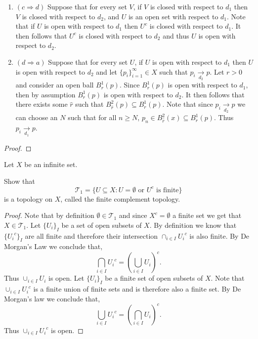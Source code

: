 \documentclass[minion]{homework651}
\newcommand\converges[1]{\mathrel{\mathop{\longrightarrow}\limits_{#1}}}
\begin{document}
\begin{problems}
\begin{enumerate}
    \item $(c \Longrightarrow d)$ Suppose that for every set $V$, if $V$ is closed with respect to $d_1$ then
    $V$ is closed with respect to $d_2$, and $U$ is an open set with respect to $d_1$. Note that if $U$
    is open with respect to $d_1$ then $U^c$ is closed with respect to $d_1$. It then follows that $U^c$ is 
    closed with respect to $d_2$ and thus $U$ is open with respect to $d_2$.  
    

    \item $(d \Longrightarrow a)$ Suppose that for every set $U$, if $U$ is open with respect to $d_1$ then $U$ is open with respect to $d_2$ and let $\{p_i\}_{i=1}^\infty \in X$ such that $p_i\converges{d_2} p$. Let $r>0$ and consider an open ball $B_r^1(p)$. Since $B_r^1(p)$ is open with respect to $d_1$, then by assumption $B_r^1(p)$ is open with respect to $d_2$. It then follows that there exists some $\hat{r}$ such that $B_{\hat{r}}^2(p) \subseteq B_r^1(p)$. Note that since $p_i\converges{d_2} p$ we can choose an $N$ such that for all $n \geq N$, $p_n \in B_{\hat{r}}^2(x) \subseteq B_r^1(p)$. Thus $p_i\converges{d_1} p$.
\end{enumerate}
\begin{proof} 

\end{proof}

\problem Let $X$ be an infinite set. 
\begin{subproblems}
    \item Show that
    \begin{equation*}
        \mathcal{T}_{1} = \{ U \subseteq X: U = \emptyset \text{ or } U^c \text{ is finite}\}
    \end{equation*}
    is a topology on $X$, called the finite complement topology.
    \solution\begin{proof}
        Note that by definition $\emptyset \in \mathcal{T}_{1}$ and since $X^c = \emptyset$ a finite set 
        we get that $X \in \mathcal{T}_{1}$. Let $\{U_i\}_I$ be a set of open subsets of $X$. By definition we know that 
        $\{{U_i}^c\}_I$ are all finite and therefore their intersection $\cap_{i \in I}{U_i}^c$ is also finite.
        By De Morgan's Law we conclude that, 
        \begin{equation*}
            \bigcap_{i \in I}{U_i}^c = \left(\bigcup_{i \in I} U_i\right)^c.
        \end{equation*}
        Thus $\cup_{i \in I} U_i$ is open. Let $\{U_i\}_I$ be a finite set of open subsets of $X$. Note that $\cup_{i \in I}{U_i}^c$
        is a finite union of finite sets and is therefore also a finite set. By De Morgan's law we conclude that, 
        \begin{equation*}
            \bigcup_{i \in I}{U_i}^c = \left(\bigcap_{i \in I} U_i\right)^c.
        \end{equation*}
        Thus $\cup_{i \in I}{U_i}^c$ is open. 
    \end{proof}


\end{subproblems}
\end{problems}
\end{document}

